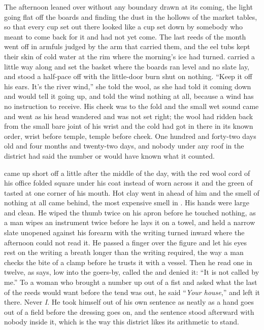 The afternoon leaned over  without any boundary drawn at its coming, the light going flat off the boards and finding the dust in the hollows of the market tables, so that every cup set out there looked like a cup set down by somebody who meant to come back for it and had not yet come. The last reeds of the month went off in armfuls judged by the arm that carried them, and the eel tubs kept their skin of cold water at the rim where the morning's ice had turned.  carried  a little way along  and set the basket where the boards ran level and no slate lay, and stood a half-pace off with the little-door burn shut on nothing. “Keep it off his ears. It's the river wind,” she told the wool, as she had told it coming down and would tell it going up, and told the wind nothing at all, because a wind has no instruction to receive. His cheek was to the fold and the small wet sound came and went as his head wandered and was not set right; the wool had ridden back from the small bare joint of his wrist and the cold had got in there in its known order, wrist before temple, temple before cheek. One hundred and forty-two days old and four months and twenty-two days, and nobody under any roof in the district had said the number or would have known what it counted.

 came up short off  a little after the middle of the day, with the red wool cord of his office folded square under his coat instead of worn across it and the green of tasted  at one corner of his mouth. Hot clay went in ahead of him and the smell of nothing at all came behind, the most expensive smell in . His hands were large and clean. He wiped the thumb twice on his apron before he touched nothing, as a man wipes an instrument twice before he lays it on a towel, and held a narrow slate unopened against his forearm with the writing turned inward where the afternoon could not read it. He passed a finger over the figure and let his eyes rest on the writing a breath longer than the writing required, the way a man checks the bite of a clamp before he trusts it with a vessel. Then he read one in twelve, as  says, low into the goers-by, called the  and denied it: “It is not called by me.” To a woman who brought a number up out of a fist and asked what the last of the reeds would want before the tend was out, he said “\emph{Your house},” and left it there. Never \emph{I}. He took himself out of his own sentence as neatly as a hand goes out of a field before the dressing goes on, and the sentence stood afterward with nobody inside it, which is the way this district likes its arithmetic to stand.

